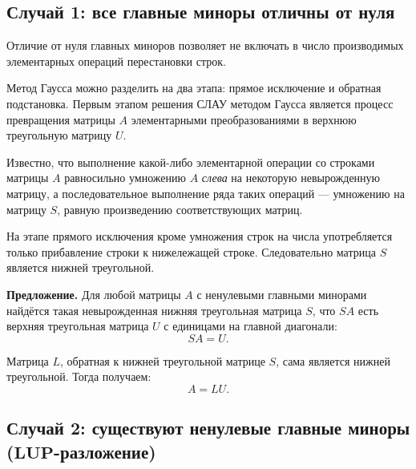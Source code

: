 \documentclass[11pt,a4paper]{article}
\begin{document}
    \hypertarget{ux441ux43bux443ux447ux430ux439-1-ux432ux441ux435-ux433ux43bux430ux432ux43dux44bux435-ux43cux438ux43dux43eux440ux44b-ux43eux442ux43bux438ux447ux43dux44b-ux43eux442-ux43dux443ux43bux44f}{%
\subsection{Случай 1: все главные миноры отличны от
нуля}\label{ux441ux43bux443ux447ux430ux439-1-ux432ux441ux435-ux433ux43bux430ux432ux43dux44bux435-ux43cux438ux43dux43eux440ux44b-ux43eux442ux43bux438ux447ux43dux44b-ux43eux442-ux43dux443ux43bux44f}}

Отличие от нуля главных миноров позволяет не включать в число
производимых элементарных операций перестановки строк.

Метод Гаусса можно разделить на два этапа: прямое исключение и обратная
подстановка. Первым этапом решения СЛАУ методом Гаусса является процесс
превращения матрицы \(A\) элементарными преобразованиями в верхнюю
треугольную матрицу \(U\).

Известно, что выполнение какой-либо элементарной операции со строками
матрицы \(A\) равносильно умножению \(A\) \emph{слева} на некоторую
невырожденную матрицу, а последовательное выполнение ряда таких операций
--- умножению на матрицу \(S\), равную произведению соответствующих
матриц.

На этапе прямого исключения кроме умножения строк на числа употребляется
только прибавление строки к нижележащей строке. Следовательно матрица
\(S\) является нижней треугольной.

\textbf{Предложение.} Для любой матрицы \(A\) с ненулевыми главными
минорами найдётся такая невырожденная нижняя треугольная матрица \(S\),
что \(SA\) есть верхняя треугольная матрица \(U\) с единицами на главной
диагонали: \[ SA = U. \]

Матрица \(L\), обратная к нижней треугольной матрице \(S\), сама
является нижней треугольной. Тогда получаем: \[ A = LU. \]

    \hypertarget{ux441ux43bux443ux447ux430ux439-2-ux441ux443ux449ux435ux441ux442ux432ux443ux44eux442-ux43dux435ux43dux443ux43bux435ux432ux44bux435-ux433ux43bux430ux432ux43dux44bux435-ux43cux438ux43dux43eux440ux44b-mathbflup-ux440ux430ux437ux43bux43eux436ux435ux43dux438ux435}{%
\subsection{\texorpdfstring{Случай 2: существуют ненулевые главные
миноры
(\(\mathbf{LUP}\)-разложение)}{Случай 2: существуют ненулевые главные миноры (\textbackslash{}mathbf\{LUP\}-разложение)}}\label{ux441ux43bux443ux447ux430ux439-2-ux441ux443ux449ux435ux441ux442ux432ux443ux44eux442-ux43dux435ux43dux443ux43bux435ux432ux44bux435-ux433ux43bux430ux432ux43dux44bux435-ux43cux438ux43dux43eux440ux44b-mathbflup-ux440ux430ux437ux43bux43eux436ux435ux43dux438ux435}}
\end{document}
